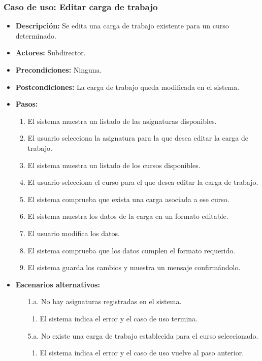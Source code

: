 \documentclass{book}
\begin{document}
\subsubsection*{Caso de uso: Editar carga de trabajo}
\begin{itemize}
\item{\bf Descripción:} Se edita una carga de trabajo existente para un curso determinado.
\item{\bf Actores:} Subdirector.
\item{\bf Precondiciones:} Ninguna.
\item{\bf Postcondiciones:} La carga de trabajo queda modificada en el sistema.
\item{\bf Pasos:}
	\begin{enumerate}
	\item El sistema muestra un listado de las asignaturas disponibles.
	\item El usuario selecciona la asignatura para la que desea editar la carga de trabajo.
	\item El sistema muestra un listado de los cursos disponibles.
	\item El usuario selecciona el curso para el que desea editar la carga de trabajo.
	\item El sistema comprueba que exista una carga asociada a ese curso.
	\item El sistema muestra los datos de la carga en un formato editable.
	\item El usuario modifica los datos.
	\item El sistema comprueba que los datos cumplen el formato requerido.
	\item El sistema guarda los cambios y muestra un mensaje confirmándolo.
	\end{enumerate}
\item{\bf Escenarios alternativos:}
	\begin{itemize}
	\item[1.a.] No hay asignaturas registradas en el sistema.
		\begin{enumerate}
		\item El sistema indica el error y el caso de uso termina.
		\end{enumerate}
	\item[5.a.] No existe una carga de trabajo establecida para el curso seleccionado.
		\begin{enumerate}
		\item El sistema indica el error y el caso de uso vuelve al paso anterior.
		\end{enumerate}

\end{itemize}
\end{itemize}
\end{document}
